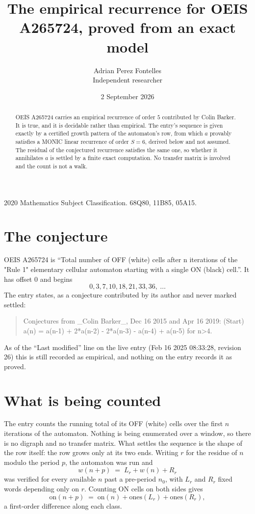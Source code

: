 \documentclass[11pt,a4paper]{article}
\title{The empirical recurrence for OEIS A265724, proved from an exact model}
\author{Adrian Perez Fontelles\\ \small Independent researcher}
\date{2 September 2026}
\theoremstyle{plain}
\theoremstyle{definition}
\begin{document}
\maketitle

\begin{abstract}
OEIS A265724 carries an empirical recurrence of order $5$ contributed by Colin Barker. It is true, and it is
decidable rather than empirical. The entry's sequence is given exactly by a certified growth pattern of the automaton's row, from
which $a$ provably satisfies a MONIC linear recurrence of order $S=6$, derived below and not
assumed. The residual of the conjectured recurrence satisfies the same one, so whether it
annihilates $a$ is settled by a finite exact computation. No transfer matrix is involved and
the count is not a walk.
\end{abstract}

\noindent\small 2020 Mathematics Subject Classification. 68Q80, 11B85, 05A15.\normalsize

\section{The conjecture}

OEIS A265724 is ``Total number of OFF (white) cells after n iterations of the "Rule 1" elementary cellular automaton starting with a single ON (black) cell.''. It has offset $0$ and begins
\[
0, 3, 7, 10, 18, 21, 33, 36,\ \dots
\]
The entry states, as a conjecture contributed by its author and never marked settled:
\begin{quote}
Conjectures from \_Colin Barker\_, Dec 16 2015 and Apr 16 2019: (Start) a(n) = a(n-1) + 2*a(n-2) - 2*a(n-3) - a(n-4) + a(n-5) for n>4.
\end{quote}
As of the ``Last modified'' line on the live entry (Feb 16 2025 08:33:28, revision 26)
this is still recorded as empirical, and nothing on the entry records it as proved.

\section{What is being counted}

The entry counts the running total of its OFF (white) cells over the first $n$ iterations of the automaton. Nothing is being enumerated over a window, so there is
no digraph and no transfer matrix. What settles the sequence is the shape of the row itself:
the row grows only at its two ends. Writing
$r$ for the residue of $n$ modulo the period $p$, the automaton was run and
\[
w(n+p)\;=\;L_r + w(n) + R_r
\]
was verified for every available $n$ past a
pre-period $n_0$, with $L_r$ and $R_r$ fixed words depending only on $r$. Counting ON cells on
both sides gives
\[
\mathrm{on}(n+p)\;=\;\mathrm{on}(n)+\mathrm{ones}(L_r)+\mathrm{ones}(R_r),
\]
a first-order difference along each class.
\end{document}
